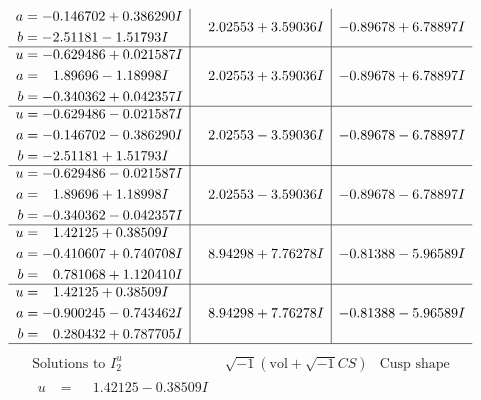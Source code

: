 \documentclass[1p]{elsarticle_modified}
\theoremstyle{definition}
\newcommand{\I}{\sqrt{-1}}
\begin{document}
$$\begin{array}{c|c|c}
\begin{aligned}
a &= -0.146702 + 0.386290 I \\
b &= -2.51181 - 1.51793 I\end{aligned}
 & \phantom{-}2.02553 + 3.59036 I & -0.89678 + 6.78897 I \\ \hline\begin{aligned}
u &= -0.629486 + 0.021587 I \\
a &= \phantom{-}1.89696 - 1.18998 I \\
b &= -0.340362 + 0.042357 I\end{aligned}
 & \phantom{-}2.02553 + 3.59036 I & -0.89678 + 6.78897 I \\ \hline\begin{aligned}
u &= -0.629486 - 0.021587 I \\
a &= -0.146702 - 0.386290 I \\
b &= -2.51181 + 1.51793 I\end{aligned}
 & \phantom{-}2.02553 - 3.59036 I & -0.89678 - 6.78897 I \\ \hline\begin{aligned}
u &= -0.629486 - 0.021587 I \\
a &= \phantom{-}1.89696 + 1.18998 I \\
b &= -0.340362 - 0.042357 I\end{aligned}
 & \phantom{-}2.02553 - 3.59036 I & -0.89678 - 6.78897 I \\ \hline\begin{aligned}
u &= \phantom{-}1.42125 + 0.38509 I \\
a &= -0.410607 + 0.740708 I \\
b &= \phantom{-}0.781068 + 1.120410 I\end{aligned}
 & \phantom{-}8.94298 + 7.76278 I & -0.81388 - 5.96589 I \\ \hline\begin{aligned}
u &= \phantom{-}1.42125 + 0.38509 I \\
a &= -0.900245 - 0.743462 I \\
b &= \phantom{-}0.280432 + 0.787705 I\end{aligned}
 & \phantom{-}8.94298 + 7.76278 I & -0.81388 - 5.96589 I\\
 \hline 
 \end{array}$$\newpage$$\begin{array}{c|c|c}  
\text{Solutions to }I^u_{2}& \I (\text{vol} + \sqrt{-1}CS) & \text{Cusp shape}\\
 \hline 
\begin{aligned}
u &= \phantom{-}1.42125 - 0.38509 I \\

\end{aligned}
\end{array}$$
\end{document}
